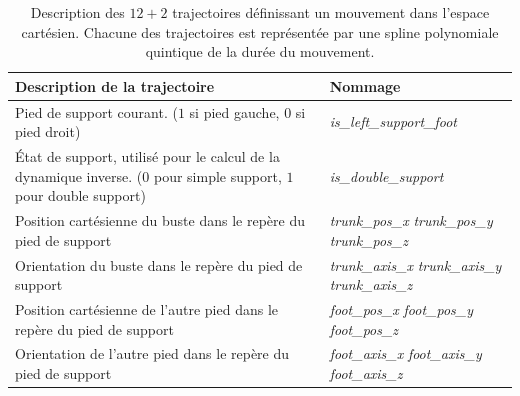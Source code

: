 \begin{table}[htb]
\begin{center}
    \begin{tabular}{|p{6cm}|p{8cm}|}
        \hline
        Description de la trajectoire & Nommage\\
        \hline
        Pied de support courant. 
        ($1$ si pied gauche, $0$ si pied droit) &
        \textit{is\_left\_support\_foot} \\
        \hline
        État de support,
        utilisé pour le calcul de la dynamique inverse.
        ($0$ pour simple support, $1$ pour double support) &
        \textit{is\_double\_support} \\
        \hline
        Position cartésienne du buste 
        dans le repère du pied de support &
        \textit{trunk\_pos\_x} \newline
        \textit{trunk\_pos\_y} \newline
        \textit{trunk\_pos\_z} \\
        \hline
        Orientation du buste dans le repère
        du pied de support &
        \textit{trunk\_axis\_x} \newline
        \textit{trunk\_axis\_y} \newline
        \textit{trunk\_axis\_z} \\
        \hline
        Position cartésienne de l'autre pied 
        dans le repère du pied de support &
        \textit{foot\_pos\_x} \newline
        \textit{foot\_pos\_y} \newline
        \textit{foot\_pos\_z} \\
        \hline
        Orientation de l'autre pied dans le repère
        du pied de support &
        \textit{foot\_axis\_x} \newline
        \textit{foot\_axis\_y} \newline
        \textit{foot\_axis\_z} \\
        \hline
    \end{tabular}
    \caption{\label{tab:cart_dofs}
        Description des $12+2$ trajectoires
        définissant un mouvement dans l'espace cartésien.
        Chacune des trajectoires est représentée par une
        spline polynomiale quintique de la durée du mouvement.
    }
\end{center}
\end{table}

